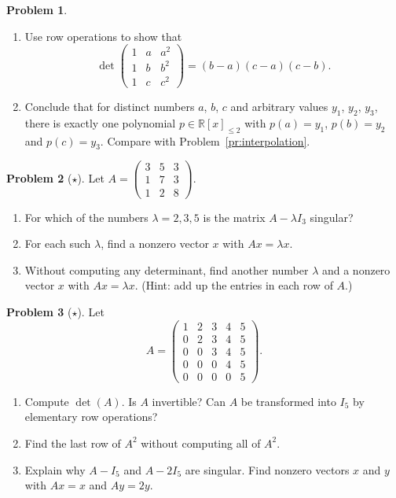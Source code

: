 \documentclass[11pt]{article}
\theoremstyle{definition}
\newtheorem{problem}{Problem}[section]
\begin{document}
\begin{problem}\label{pr:vandermonde}
    \begin{enumerate}[label=(\alph*)]
        \item Use row operations to show that
        \[\det \begin{pmatrix} 1 & a & a^2 \\ 1 & b & b^2 \\ 1 & c & c^2 \end{pmatrix} = (b - a)(c - a)(c - b).\]
        \item Conclude that for distinct numbers $a$, $b$, $c$ and arbitrary values $y_1$, $y_2$, $y_3$, there is exactly one polynomial $p \in \mathbb{R}[x]_{\leq 2}$ with $p(a) = y_1$, $p(b) = y_2$ and $p(c) = y_3$. Compare with Problem~\ref{pr:interpolation}.
    \end{enumerate}
\end{problem}

\begin{problem}[$\star$]\label{pr:lambda}
    Let $A = \begin{pmatrix} 3 & 5 & 3 \\ 1 & 7 & 3 \\ 1 & 2 & 8 \end{pmatrix}$.
    \begin{enumerate}[label=(\alph*)]
        \item For which of the numbers $\lambda = 2, 3, 5$ is the matrix $A - \lambda I_3$ singular?
        \item For each such $\lambda$, find a nonzero vector $x$ with $Ax = \lambda x$.
        \item Without computing any determinant, find another number $\lambda$ and a nonzero vector $x$ with $Ax = \lambda x$. (Hint: add up the entries in each row of $A$.)
    \end{enumerate}
\end{problem}

\begin{problem}[$\star$]\label{pr:upper5}
    Let
    \[A = \begin{pmatrix} 1 & 2 & 3 & 4 & 5 \\ 0 & 2 & 3 & 4 & 5 \\ 0 & 0 & 3 & 4 & 5 \\ 0 & 0 & 0 & 4 & 5 \\ 0 & 0 & 0 & 0 & 5 \end{pmatrix}.\]
    \begin{enumerate}[label=(\alph*)]
        \item Compute $\det(A)$. Is $A$ invertible? Can $A$ be transformed into $I_5$ by elementary row operations?
        \item Find the last row of $A^2$ without computing all of $A^2$.
        \item Explain why $A - I_5$ and $A - 2I_5$ are singular. Find nonzero vectors $x$ and $y$ with $Ax = x$ and $Ay = 2y$.
    \end{enumerate}
\end{problem}
\end{document}
